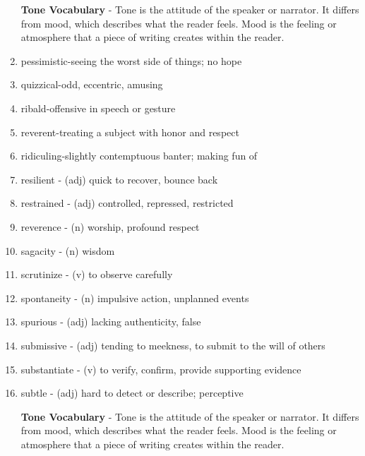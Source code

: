 \documentclass[12pt]{book}
\begin{document}
\begin{enumerate}
\bigskip
\textbf{Tone Vocabulary} - Tone is the attitude of the speaker or narrator.  It differs from mood, which describes what the reader feels.  Mood is the feeling or atmosphere that a piece of writing creates within the reader.  

\bigskip
\item pessimistic-seeing the worst side of things; no hope
\item quizzical-odd, eccentric, amusing
\item ribald-offensive in speech or gesture
\item reverent-treating a subject with honor and respect
\item ridiculing-slightly contemptuous banter; making fun of

\bigskip

\item resilient - (adj) quick to recover, bounce back
\item restrained - (adj) controlled, repressed, restricted
\item reverence - (n) worship, profound respect
\item sagacity - (n) wisdom
\item scrutinize - (v) to observe carefully
\item spontaneity - (n) impulsive action, unplanned events
\item spurious - (adj) lacking authenticity, false
\item submissive -  (adj) tending to meekness, to submit to the will of others
\item substantiate - (v) to verify, confirm, provide supporting evidence
\item subtle - (adj) hard to detect or describe; perceptive

\bigskip
\textbf{Tone Vocabulary} - Tone is the attitude of the speaker or narrator.  It differs from mood, which describes what the reader feels.  Mood is the feeling or atmosphere that a piece of writing creates within the reader.  


\end{enumerate}
\end{document}
